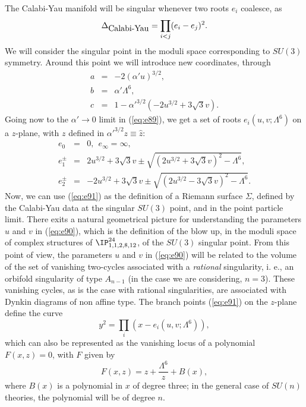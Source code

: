 The Calabi-Yau manifold will be singular whenever two roots $e_i$
coalesce, as
\begin{equation}
\Delta_{\hbox {Calabi-Yau}}=\prod_{i<j}(e_i-e_j)^2.
\label{eq:e89}
\end{equation}
We will consider the  singular point in the moduli space
corresponding to $SU(3)$ symmetry. Around this point we will
introduce new coordinates, through
\begin{eqnarray}
a & = & -2 (\alpha' u)^{3/2}, \nonumber \\
b & = & \alpha' \Lambda^6, \nonumber \\
c & = & 1 - \alpha'^{3/2}(-2 u^{3/2} +3\sqrt{3} v).
\label{eq:e90}
\end{eqnarray}
Going now to the $\alpha' \rightarrow 0$ limit in (\ref{eq:e89}),
we get a set of roots $e_i(u,v;\Lambda^6)$ on a $z$-plane, with
$z$ defined in $\alpha'^{3/2} z \equiv \hat{z}$:
\begin{eqnarray}
e_0 & = & 0, \: \: e_{\infty} = \infty, \nonumber \\
e_1^{\pm} & = & 2u^{3/2} + 3\sqrt{3}v \pm
\sqrt{(2u^{3/2}+3\sqrt{3}v)^2- \Lambda^6}, \nonumber \\
e_2^{\pm} & = & - 2u^{3/2} + 3\sqrt{3}v \pm
\sqrt{(2u^{3/2}-3\sqrt{3}v)^2- \Lambda^6}.
\label{eq:e91}
\end{eqnarray}
Now, we can use (\ref{eq:e91}) as the definition of a Riemann
surface $\Sigma$, defined by the Calabi-Yau data at the singular
$SU(3)$ point, and in the point particle limit. There exits a
natural geometrical picture for understanding the parameters $u$
and $v$ in (\ref{eq:e90}), which is the definition of the blow
up, in the moduli space of complex structures of
$\IP_{1,1,2,8,12}^{24}$, of the $SU(3)$ singular point. From this
point of view, the parameters $u$ and $v$ in (\ref{eq:e90}) will
be related to the volume of the set of vanishing two-cycles
associated with a {\em rational} singularity, i. e., an orbifold
singularity of type $A_{n-1}$ (in the case we are considering,
$n=3$). These vanishing cycles, as is the case with rational
singularities, are associated with Dynkin diagrams of non affine
type. The branch points (\ref{eq:e91}) on the $z$-plane define
the curve
\begin{equation}
y^2 = \prod_i (x-e_i(u,v;\Lambda^6)), 
\label{eq:e93}
\end{equation}
which can also be represented as the vanishing locus of a
polynomial $F(x,z)=0$, with $F$ given by \cite{int1,int2}
\begin{equation}
F(x,z)=z + \frac {\Lambda^6}{z} + B(x),
\label{eq:e94}
\end{equation}
where $B(x)$ is a polynomial in $x$ of degree three; in the general
case of $SU(n)$ theories, the polynomial will be of degree $n$. 
  
